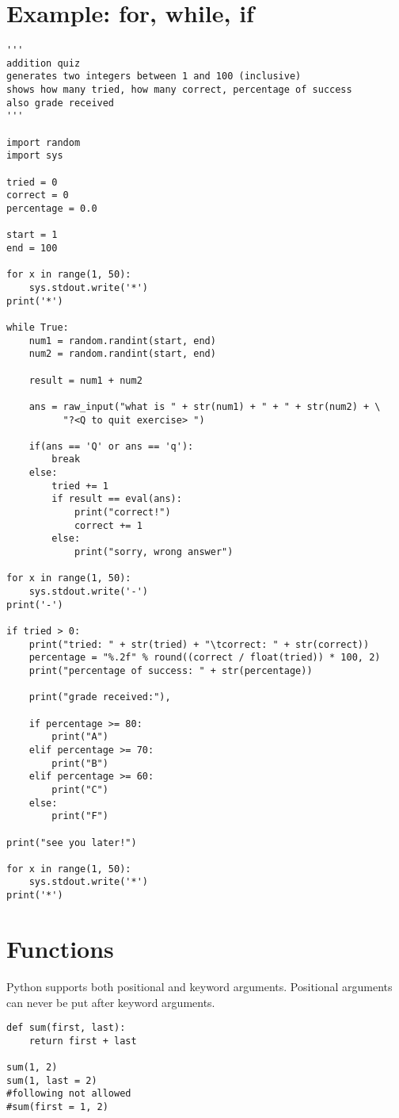 \documentclass[a4paper, 12pt]{article}
\begin{document}
\section{Example: for, while, if}
\begin{verbatim}
'''
addition quiz
generates two integers between 1 and 100 (inclusive)
shows how many tried, how many correct, percentage of success
also grade received
'''

import random
import sys

tried = 0
correct = 0
percentage = 0.0

start = 1
end = 100

for x in range(1, 50):
    sys.stdout.write('*')
print('*')

while True:
    num1 = random.randint(start, end)
    num2 = random.randint(start, end)

    result = num1 + num2

    ans = raw_input("what is " + str(num1) + " + " + str(num2) + \
	      "?<Q to quit exercise> ")

    if(ans == 'Q' or ans == 'q'):
        break
    else:
        tried += 1
        if result == eval(ans):
            print("correct!")
            correct += 1
        else:
            print("sorry, wrong answer")

for x in range(1, 50):
    sys.stdout.write('-')
print('-')

if tried > 0:
    print("tried: " + str(tried) + "\tcorrect: " + str(correct))
    percentage = "%.2f" % round((correct / float(tried)) * 100, 2)
    print("percentage of success: " + str(percentage))
    
    print("grade received:"),

    if percentage >= 80:
        print("A")
    elif percentage >= 70:
        print("B")
    elif percentage >= 60:
        print("C")
    else:
        print("F")

print("see you later!")

for x in range(1, 50):
    sys.stdout.write('*')
print('*')
\end{verbatim}

\section{Functions}
Python supports both positional and keyword arguments. Positional arguments can never be put after keyword arguments.
\begin{verbatim}
def sum(first, last):
    return first + last

sum(1, 2)
sum(1, last = 2)
#following not allowed
#sum(first = 1, 2)
\end{verbatim}
\end{document}

